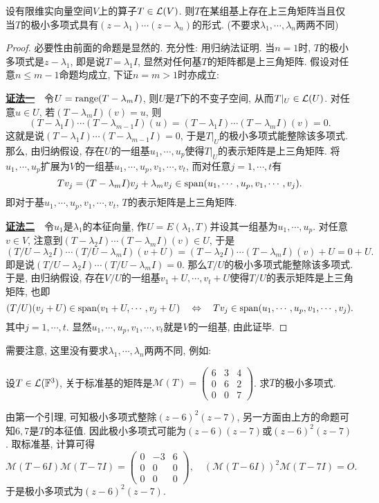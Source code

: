 \begin{proposition}{}
	设有限维实向量空间$V$上的算子$T \in \mathcal{L} (V)$. 则$T$在某组基上存在上三角矩阵当且仅当$T$的极小多项式具有$(z-\lambda _1)\cdots (z-\lambda _n)$的形式. (不要求$\lambda _1,\cdots ,\lambda _n$两两不同)
\end{proposition}
\begin{proof}
	必要性由前面的命题是显然的. 充分性: 用归纳法证明. 当$n=1$时, $T$的极小多项式是$z-\lambda _1$, 即是说$T=\lambda _1I$, 显然对任何基$T$的矩阵都是上三角矩阵. 假设对任意$n \leq m-1$命题均成立, 下证$n=m>1$时亦成立: 
	
	\underline{\textbf{证法一}}~~令$U=\operatorname{range} (T-\lambda _mI)$, 则$U$是$T$下的不变子空间, 从而$T|_U \in \mathcal{L} (U)$. 对任意$u \in U$, 若$(T-\lambda _mI)(v)=u$, 则$$(T-\lambda _1I) \cdots (T-\lambda _{m-1}I)(u) = (T-\lambda _1I) \cdots (T-\lambda _mI)(v) = 0.$$
	这就是说$(T-\lambda _1I) \cdots (T-\lambda _{m-1}I)=0$, 于是$T|_U$的极小多项式能整除该多项式. 那么, 由归纳假设, 存在$U$的一组基$u_1,\cdots ,u_p$使得$T|_U$的表示矩阵是上三角矩阵. 将$u_1,\cdots ,u_p$扩展为$V$的一组基$u_1,\cdots ,u_p,v_1,\cdots ,v_t$, 而对任意$j=1,\cdots ,t$有$$Tv_j = (T-\lambda _mI)v_j + \lambda _mv_j \in \operatorname{span} (u_1,\cdots ,u_p,v_1,\cdots ,v_j). $$
	即对于基$u_1,\cdots ,u_p,v_1,\cdots ,v_t$, $T$的表示矩阵是上三角矩阵. 
	
	\underline{\textbf{证法二}}~~令$u_1$是$\lambda _1$的本征向量, 作$U = E(\lambda _1,T)$并设其一组基为$u_1,\cdots ,u_p$. 对任意$v \in V$, 注意到$(T-\lambda _2I) \cdots (T-\lambda _mI)(v) \in U$, 于是$$(T/U-\lambda _2I) \cdots (T/U-\lambda _mI)(v+U) = (T-\lambda _2I) \cdots (T-\lambda _mI)(v)+U = 0+U.$$ 
	即是说$(T/U-\lambda _2I) \cdots (T/U-\lambda _mI)=0$. 那么$T/U$的极小多项式能整除该多项式. 于是, 由归纳假设, 存在$V/U$的一组基$v_1+U,\cdots ,v_t+U$使得$T/U$的表示矩阵是上三角矩阵, 也即$$(T/U)(v_j+U) \in \operatorname{span} (v_1+U,\cdots ,v_j+U) \quad \Leftrightarrow \quad Tv_j \in \operatorname{span} (u_1,\cdots ,u_p,v_1,\cdots ,v_j).$$
	其中$j=1,\cdots ,t$. 显然$u_1,\cdots ,u_p,v_1,\cdots ,v_t$就是$V$的一组基, 由此证毕. 
\end{proof}

需要注意, 这里没有要求$\lambda _1,\cdots ,\lambda _n$两两不同, 例如: 

\begin{example}
	设$T \in \mathcal{L} (\mathbb{F} ^3)$, 关于标准基的矩阵是$\mathcal{M}(T) = \begin{pmatrix}
		6 & 3 & 4 \\ 0 & 6 & 2 \\ 0 & 0 & 7
	\end{pmatrix}$. 求$T$的极小多项式. 
\end{example}
\begin{solution}
	由第一个引理, 可知极小多项式整除$(z-6)^2(z-7)$, 另一方面由上方的命题可知$6,7$是$T$的本征值. 因此极小多项式可能为$(z-6)(z-7)$或$(z-6)^2(z-7)$. 取标准基, 计算可得$$\mathcal{M} (T-6I) \mathcal{M} (T-7I) = \begin{pmatrix}
		0 & -3 & 6 \\ 0 & 0 & 0 \\ 0 & 0 & 0
	\end{pmatrix},\quad (\mathcal{M} (T-6I))^2 \mathcal{M} (T-7I) = O. $$
	于是极小多项式为$(z-6)^2(z-7)$. 
\end{solution}

